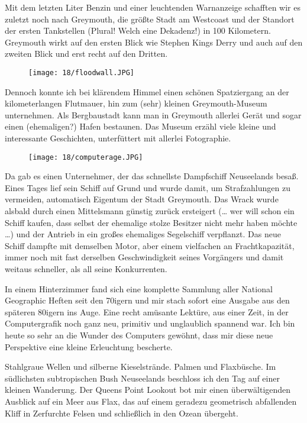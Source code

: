 Mit dem letzten Liter Benzin und einer leuchtenden Warnanzeige
schafften wir es zuletzt noch nach Greymouth, die größte Stadt am
Westcoast und der Standort der ersten Tankstellen (Plural!
Welch eine Dekadenz!) in 100 Kilometern. Greymouth wirkt auf den
ersten Blick wie Stephen Kings Derry und auch auf den zweiten Blick
und erst recht auf den Dritten.

\begin{figure}[h]
  \centering
  \texttt{[image: 18/floodwall.JPG]}
\end{figure}
Dennoch konnte ich bei klärendem Himmel einen schönen Spatziergang an
der kilometerlangen Flutmauer, hin zum (sehr) kleinen Greymouth-Museum
unternehmen. Als Bergbaustadt kann man in Greymouth allerlei Gerät und
sogar einen (ehemaligen?)  Hafen bestaunen. Das Museum erzähl viele
kleine und interessante Geschichten, unterfüttert mit allerlei
Fotographie.

\begin{figure}[h]
  \centering
  \texttt{[image: 18/computerage.JPG]}
\end{figure}

Da gab es einen Unternehmer, der das schnellste Dampfschiff
Neuseelands besaß. Eines Tages lief sein Schiff auf Grund und wurde
damit, um Strafzahlungen zu vermeiden, automatisch Eigentum der Stadt
Greymouth. Das Wrack wurde alsbald durch einen Mittelsmann günstig
zurück ersteigert (\ldots{} wer will schon ein Schiff kaufen, dass
selbst der ehemalige stolze Besitzer nicht mehr haben möchte \ldots{})
und der Antrieb in ein großes ehemaliges Segelschiff verpflanzt. Das
neue Schiff dampfte mit demselben Motor, aber einem vielfachen an
Frachtkapazität, immer noch mit fast derselben Geschwindigkeit seines
Vorgängers und damit weitaus schneller, als all seine Konkurrenten.

In einem Hinterzimmer fand sich eine komplette Sammlung aller National
Geographic Heften seit den 70igern und mir stach sofort eine Ausgabe
aus den späteren 80igern ins Auge. Eine recht amüsante Lektüre, aus
einer Zeit, in der Computergrafik noch ganz neu, primitiv und
unglaublich spannend war. Ich bin heute so sehr an die Wunder des
Computers gewöhnt, dass mir diese neue Perspektive eine kleine
Erleuchtung bescherte.

Stahlgraue Wellen und silberne Kieselstrände. Palmen und
Flaxbüsche. Im südlichsten subtropischen Bush Neuseelands beschloss
ich den Tag auf einer kleinen Wanderung. Der Queens Point Lookout bot
mir einen überwältigenden Ausblick auf ein Meer aus Flax, das auf
einem geradezu geometrisch abfallenden Kliff in Zerfurchte Felsen und
schließlich in den Ozean übergeht.

